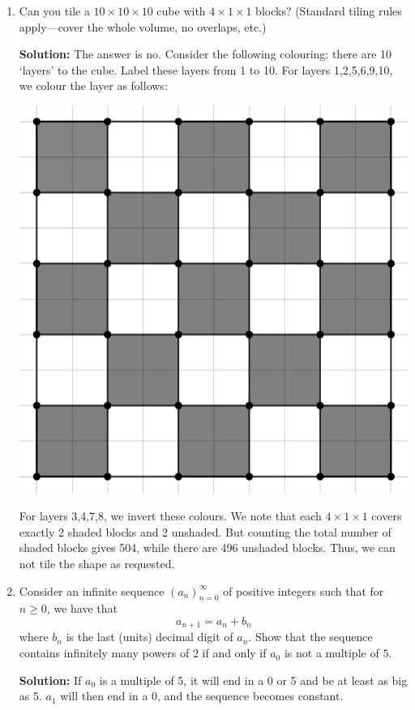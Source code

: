 \documentclass{article}
\begin{document}
\begin{enumerate}[itemsep=24pt]
\item %
Can you tile a $10\times 10\times 10$ cube with $4\times 1\times 1$ blocks? (Standard tiling rules apply---cover the whole volume, no overlaps, etc.)

\textbf{Solution:}
The answer is no. Consider the following colouring: there are 10 `layers' to the cube. Label these layers from 1 to 10. For layers 1,2,5,6,9,10, we colour the layer as follows:
\begin{center}
\includegraphics[scale=0.5]{Capture.png}
\end{center}
For layers 3,4,7,8, we invert these colours.
We note that each $4\times 1\times 1$ covers exactly 2 shaded blocks and 2 unshaded.
But counting the total number of shaded blocks gives 504, while there are 496 unshaded blocks.
Thus, we can not tile the shape as requested. 


\item %
Consider an infinite sequence $(a_n)_{n=0}^{\infty}$ of positive integers such that for $n \geq 0$, we have that
\[
    a_{n + 1} = a_n + b_n
\]
where $b_n$ is the last (units) decimal digit of $a_n$. Show that the sequence contains infinitely many powers of $2$ if and only if $a_0$ is not a multiple of $5$.

\textbf{Solution:}
If $a_0$ is a multiple of 5, it will end in a 0 or 5 and be at least as big as 5. $a_1$ will then end in a 0, and the sequence becomes constant.


\end{enumerate}
\end{document}
